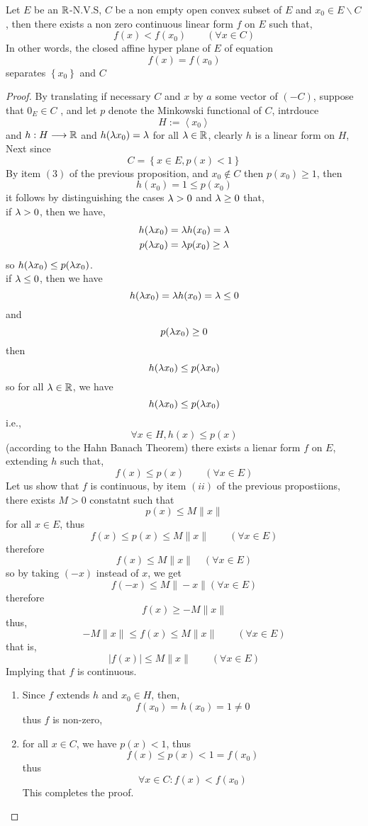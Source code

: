 \begin{corollary}[]
Let $E $ be an $\mathbb{R} $-N.V.S, $C$ be a non empty open convex subset of $E$ 
and $x_0 \in  E \backslash C $, then there exists a non zero continuous linear 
form $f $ on $E$ such that, 
\[
f(x) <  f(x_0) \quad \quad \left( 
	\forall x \in  C
\right)
\]
In other words, the closed affine hyper plane of $E$ of equation 
\[
f(x) = f(x_0) 
\] 
separates $\left\{ x_0 \right\} $ and $C$
\end{corollary}
\begin{proof}
By translating if necessary $C $ and $x$   
by $a $ some vector of $(-C)  $, suppose that $0_{E} \in C$ , 
and let $p $ denote the Minkowski functional of $C $, intrdouce 
\[
H:= \left\langle x_0 \right\rangle 
\]
and $ h :H  \longrightarrow  \mathbb{R}  $ and 
$h(\lambda x_0) = \lambda $ for all $\lambda \in  \mathbb{R}  $, clearly $h $ is a linear 
form on $H $, Next since 
\[
C =
\left\{ 
	x \in  E, 
	p(x) < 1
\right\}
\]
By item $(3)$ of the previous proposition, 
and $x_0 \notin C $ then $p(x_0) \geq 1 $, then 
\[
h(x_0)  = 1 \leq p(x_0) 
\]  
it follows by distinguishing the cases $\lambda > 0 $ and 
$\lambda \geq 0 $ that,  \\
if $\lambda > 0 $, then we have, 
\begin{align*}
	h( \lambda x_{0})  &= 
	\lambda h(x_0) = \lambda \\
	p( \lambda x_0)  &= 
	\lambda p(x_0)  \geq  \lambda
\end{align*}
so $h(\lambda x_0) \leq p( \lambda x_0)  $. 
\\
if $\lambda \leq 0  $, then we have 
\[
	h ( \lambda x_0)  = \lambda h(x_0)  = \lambda \leq 0
\] 
and 
\[
p (\lambda x_0)  \geq 0
\]
then 
\[
h ( \lambda x_0)  \leq  p( \lambda x_0) 
\]
so for all $\lambda \in  \mathbb{R}  $, we have 
\[
h ( \lambda x_0)  \leq p ( \lambda x_0) 
\]
i.e., 
\[
\forall  x \in  H, 
h(x) \leq p(x) 
\]
(according to the Hahn Banach Theorem) there exists a lienar form $f $ on 
$E $, extending $h $ such that, 
\[
f(x)  \leq  p(x) \quad \quad 
\left( \forall  x \in E \right)
\] 
Let us show that $f $ is continuous, by item $(ii)$ of the previous propostiions, there exists
$M > 0 $ constatnt such that 
\[
p(x) \leq  M \| x \| 
\]
for all $x \in  E $, thus 
\[
	f(x) \leq p(x) \leq M \| x \|    \quad \quad 
	\left( 
		\forall  x \in E
	\right)
\]
therefore 
\[
f(x)  \leq M \| x \| \quad \left( 
	\forall x \in  E
\right)
\] 
so by taking $(-x)$ instead of $x $, we get 
\[
f(-x) \leq  M \| -x \|  \left( 
\forall  x \in  E\right)
\]
therefore 
\[
f(x) \geq - M \| x \| 
\]
thus, 
\[
-M \| x \| \leq f(x)  \leq  M \| x \| \quad  \quad 
\left( 
	\forall  x \in  E
\right)
\]
that is, 
\[
\left| f(x)  \right| \leq M \| x \|  \quad \quad 
\left( 
	\forall  x \in E
\right)
\]
Implying that $f $ is continuous.  \\
\begin{enumerate}
\item 
Since $f $ extends $h $ and $x_0 \in  H $, then, 
\[
f(x_0)  = h(x_0)  = 1 \neq 0
\]
thus $f $ is non-zero, 
\item  
for all $x \in  C$,  we have $p(x) <  1 $, thus 
\[
f(x)  \leq  p(x)  <  1 = f(x_0) 
\]
thus 
\[
\forall  x \in  C : f(x)  <  f(x_0) 
\]
This completes the proof.
\end{enumerate}
\end{proof}
% 
